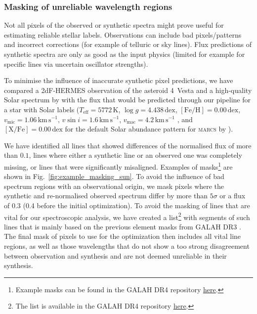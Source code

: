 \documentclass[
  journal=pasa,
  manuscript=research-paper, %
  year=2024,
  volume=37
]{cup-journal}
\newcommand{\marcs}{\textsc{marcs}\xspace}
\newcommand{\dex}{\,\mathrm{dex}}	%
\newcommand{\K}{\,\mathrm{K}}	%
\newcommand{\kms}{\,\mathrm{km\,s^{-1}}}	%
\begin{document}
\subsubsection{Masking of unreliable wavelength regions} \label{sec:masking_of_unreliable_wavelength_regions}

Not all pixels of the observed or synthetic spectra might prove useful for estimating reliable stellar labels. Observations can include bad pixels/patterns and incorrect corrections (for example of telluric or sky lines). Flux predictions of synthetic spectra are only as good as the input physics (limited for example for specific lines via uncertain oscillator strengths).

To minimise the influence of inaccurate synthetic pixel predictions, we have compared a 2dF-HERMES observation of the asteroid 4~Vesta and a high-quality Solar spectrum by \citet{Hinkle2000} with the flux that would be predicted through our pipeline for a star with Solar labels ($T_\text{eff} = 5772\K$, $\log g = 4.438\dex$, $\mathrm{[Fe/H]} = 0.00\dex$, $v_\text{mic} = 1.06\kms$, $v \sin i = 1.6\kms$, $v_\text{mac} = 4.2\kms$ \citep{Prsa2016, Jofre2017}, and $\mathrm{[X/Fe]} = 0.00\dex$ for the default Solar abundance pattern for \marcs by \citet{Grevesse2007}).

We have identified all lines that showed differences of the normalised flux of more than $0.1$, lines where either a synthetic line or an observed one was completely missing, or lines that were significantly misaligned. Examples of masks\footnote{Example masks can be found in the GALAH DR4 repository  \href{https://github.com/svenbuder/GALAH_DR4/blob/main/spectrum_analysis/spectrum_masks}{here}.} are shown in Fig.~\ref{fig:example_masking_sun}. To avoid the influence of bad spectrum regions with an observational origin, we mask pixels where the synthetic and re-normalised observed spectrum differ by more than $5\sigma$ or a flux of 0.3 (0.4 before the initial optimization). To avoid the masking of lines that are vital for our spectroscopic analysis, we have created a list\footnote{The list is available in the GALAH DR4 repository \href{https://github.com/svenbuder/GALAH_DR4/blob/main/spectrum_analysis/spectrum_masks/vital_lines.fits}{here}.}  with segments of such lines that is mainly based on the previous element masks from GALAH DR3 \citep{Buder2021}. The final mask of pixels to use for the optimization then includes all vital line regions, as well as those wavelengths that do not show a too strong disagreement between observation and synthesis and are not deemed unreliable in their synthesis.
\end{document}
